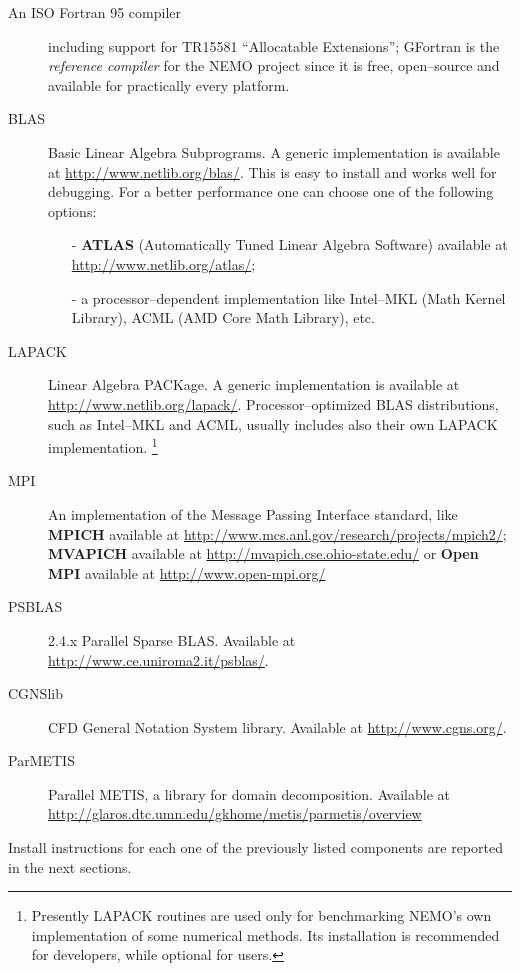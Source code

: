 \documentclass[a4paper,12pt]{article}%
\begin{document}
\begin{description}
\item [An ISO Fortran 95 compiler] including support for TR15581
    ``Allocatable Extensions'';  GFortran is the \emph{reference
    compiler} for the NEMO project since it is free, open--source and
  available for practically every platform.
\item [BLAS] Basic Linear Algebra Subprograms. A generic
  implementation is available at
  \url{http://www.netlib.org/blas/}. This is easy to install and works
  well for debugging. For a better performance one can choose
  one of the following options:
  \begin{itemize}
  \item [-] \textbf{ATLAS} (Automatically Tuned Linear Algebra
    Software) available at \url{http://www.netlib.org/atlas/};
  \item [-] a processor--dependent implementation like Intel--MKL
  (Math Kernel Library), ACML (AMD Core Math Library), etc.
  \end{itemize}
\item [LAPACK] Linear Algebra PACKage. A generic implementation is
  available at
  \url{http://www.netlib.org/lapack/}. Processor--optimized BLAS
  distributions, such as Intel--MKL and ACML, usually includes also their
  own LAPACK implementation. \footnote{Presently LAPACK routines are
    used only for benchmarking NEMO's own implementation of some
    numerical methods. Its installation is recommended for developers,
    while optional for users.}
\item [MPI] An implementation of the Message Passing Interface standard,
 like {\bf MPICH} available at \url{http://www.mcs.anl.gov/research/projects/mpich2/};
{\bf MVAPICH} available at \url{http://mvapich.cse.ohio-state.edu/} or
{\bf Open MPI} available at \url{http://www.open-mpi.org/}

\item [PSBLAS] 2.4.x Parallel Sparse BLAS. Available at
  \url{http://www.ce.uniroma2.it/psblas/}.
\item [CGNSlib] CFD General Notation System library. Available at
  \url{http://www.cgns.org/}.
\item [ParMETIS] Parallel METIS, a library for domain
  decomposition. Available at
  \url{http://glaros.dtc.umn.edu/gkhome/metis/parmetis/overview}
\end{description}
Install instructions for each one of the previously listed components
are reported in the next sections.
\end{document}
